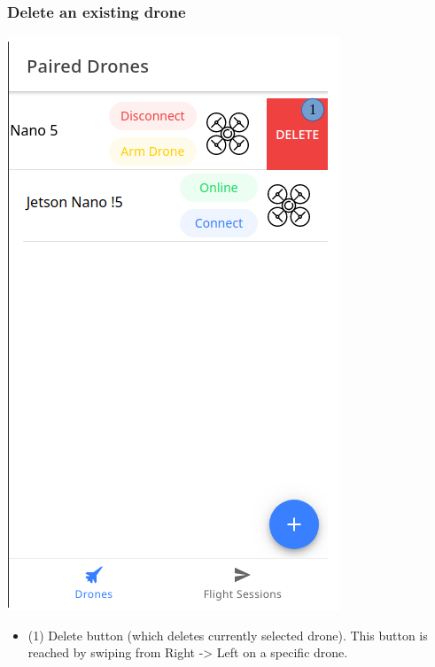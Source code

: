 \subsubsection{Delete an existing drone}
\begin{minipage}[c]{0.5\linewidth}
	\centering
	\includegraphics[scale=0.4]{./assets/images/delete.png}
	\label{fig: mainPageDeleteDrone}
\end{minipage}
\begin{minipage}[c]{0.5\linewidth}
	\begin{itemize}
		\item (1) Delete button (which deletes currently selected drone). This button is reached by swiping from Right -> Left on a specific drone.
	\end{itemize}
\end{minipage}

\newpage
